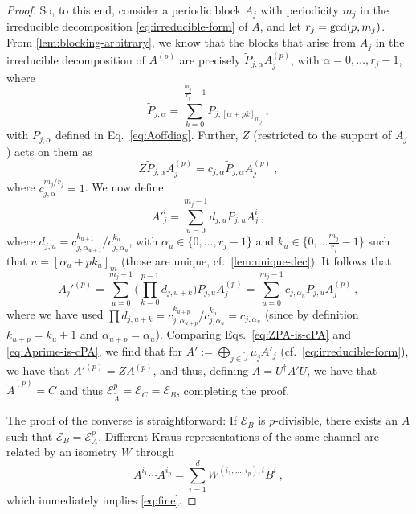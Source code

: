 \documentclass[pra,a4paper,notitlepage,nofootinbib,superscriptaddress]{revtex4-1}
\theoremstyle{plain}
\newcommand{\E}{\mathcal{E}}
\newcommand{\1}{{\openone}}
\begin{document}
\begin{proof}
    So, to this end, consider a periodic block $A_j$  with periodicity $m_j$ in the
    irreducible decomposition \eqref{eq:irreducible-form} of $A$, and let
    $r_j={\rm gcd}(p,m_j)$. From \cref{lem:blocking-arbitrary}, we know
    that the blocks that arise from $A_j$ in the irreducible decomposition of
    $A^{(p)}$ are precisely $\tilde{P}_{j,\alpha} A_j^{(p)}$,
    with
    $\alpha=0,\ldots, r_j-1$, where
    $$
        \tilde{P}_{j,\alpha}=
        \sum_{k=0}^{\frac{m_j}{r_j}-1} P_{j, [\alpha + pk]_{m_j}}\ ,
    $$
    with $P_{j,\alpha}$ defined in Eq.~\eqref{eq:Aoffdiag}.
    Further, $Z$ (restricted to the support of $A_j$) acts on them as
    \begin{equation}
        \label{eq:ZPA-is-cPA}
        Z\tilde{P}_{j,\alpha} A_j^{(p)} =
        c_{j,\alpha}\tilde{P}_{j,\alpha}
        A_j^{(p)}\ ,
    \end{equation}
    where $c_{j,\alpha}^{m_j/r_j}=1$.
    We now define
    $$
        A'^i_j=\sum_{u=0}^{m_j-1} d_{j,u} {P}_{j,u} A_j^i\ ,
    $$
    where $d_{j,u}={c_{j,\alpha_{u+1}}^{k_{u+1}}}/{c_{j,\alpha_u}^{k_u}}$,
    with
    $\alpha_u\in\{0,\ldots,r_j-1\}$ and $k_u\in\{0,\ldots \tfrac{m_j}{r_j}-1\}$
    such that  $u=[\alpha_u+pk_u]_m$ (those are unique,
    cf.~\cref{lem:unique-dec}).
    It follows that
    \begin{equation}
        \label{eq:Aprime-is-cPA}
        A_j'^{(p)}=\sum_{u=0}^{m_j-1}\Bigg( \prod_{k=0}^{p-1}
        d_{j,u+k}\Bigg) {P}_{j,u} A_j^{(p)}=
        \sum_{u=0}^{m_j-1} c_{j,\alpha_u} {P}_{j,u} A_j^{(p)}\ ,
    \end{equation}
    where we have used
    $\prod d_{j,u+k}=
        {c_{j,\alpha_{u+p}}^{k_{u+p}}}/{c_{j,\alpha_u}^{k_u}}=c_{j,\alpha_u}$
    (since by definition $k_{u+p}=k_u+1$ and $\alpha_{u+p}=\alpha_u$).
    Comparing Eqs.~\eqref{eq:ZPA-is-cPA} and \eqref{eq:Aprime-is-cPA}, we
    find that
    for $A':=\bigoplus_{j\in\tilde{J}} \mu_j A'_j$ (cf.~\eqref{eq:irreducible-form}),
    we have that $A'^{(p)}=ZA^{(p)}$, and thus, defining $\tilde A=U^\dagger A' U$, we
    have that $\tilde A^{(p)}=C$ and thus
    $\E_{\tilde A}^p=\E_C=\E_B$, completing the proof.

    The proof of the converse is straightforward:  If $\E_B$ is $p$-divisible,
    there exists an $A$ such that $\E_B=\E_A^p$.  Different Kraus
    representations of the same channel are related by an isometry $W$ through
    $$
        A^{i_1}\cdots A^{i_p } = \sum_{i=1}^d W^{{(i_1,\ldots,i_p)},i}B^i\ ,
    $$
    which immediately implies \eqref{eq:fine}.
\end{proof}
\end{document}
